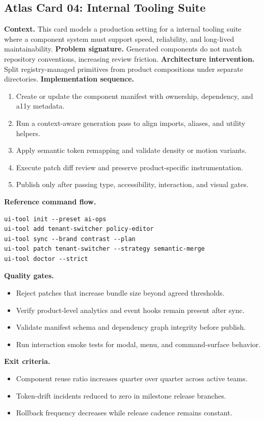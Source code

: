 \subsection*{Atlas Card 04: Internal Tooling Suite}
\textbf{Context.} This card models a production setting for a internal tooling suite where a component system must support speed, reliability, and long-lived maintainability.
\textbf{Problem signature.} Generated components do not match repository conventions, increasing review friction.
\textbf{Architecture intervention.} Split registry-managed primitives from product compositions under separate directories.
\textbf{Implementation sequence.}
\begin{enumerate}[leftmargin=*, itemsep=0.28em]
  \item Create or update the component manifest with ownership, dependency, and a11y metadata.
  \item Run a context-aware generation pass to align imports, aliases, and utility helpers.
  \item Apply semantic token remapping and validate density or motion variants.
  \item Execute patch diff review and preserve product-specific instrumentation.
  \item Publish only after passing type, accessibility, interaction, and visual gates.
\end{enumerate}
\textbf{Reference command flow.}
\begin{verbatim}
ui-tool init --preset ai-ops
ui-tool add tenant-switcher policy-editor
ui-tool sync --brand contrast --plan
ui-tool patch tenant-switcher --strategy semantic-merge
ui-tool doctor --strict
\end{verbatim}
\textbf{Quality gates.}
\begin{itemize}[leftmargin=*, itemsep=0.24em]
  \item Reject patches that increase bundle size beyond agreed thresholds.
  \item Verify product-level analytics and event hooks remain present after sync.
  \item Validate manifest schema and dependency graph integrity before publish.
  \item Run interaction smoke tests for modal, menu, and command-surface behavior.
\end{itemize}
\textbf{Exit criteria.}
\begin{itemize}[leftmargin=*, itemsep=0.24em]
  \item Component reuse ratio increases quarter over quarter across active teams.
  \item Token-drift incidents reduced to zero in milestone release branches.
  \item Rollback frequency decreases while release cadence remains constant.
\end{itemize}
\clearpage
